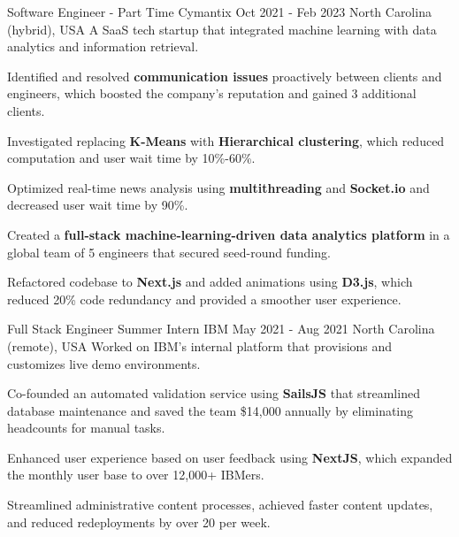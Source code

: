 \begin{cventries}
    \cventry
    {Software Engineer - Part Time} %
    {Cymantix} %
    {Oct 2021 - Feb 2023} %
    {North Carolina (hybrid), USA} %
    {A SaaS tech startup that integrated machine learning with data analytics and information retrieval.}
    {
      \begin{cvitems} %
        \item {Identified and resolved \textbf{communication issues} proactively between clients and engineers, which boosted the company's reputation and gained 3 additional clients.}
        \item {Investigated replacing \textbf{K-Means} with \textbf{Hierarchical clustering}, which reduced computation and user wait time by 10\%-60\%.}
        \item {Optimized real-time news analysis using \textbf{multithreading} and \textbf{Socket.io} and decreased user wait time by 90\%.}
        \item {Created a \textbf{full-stack machine-learning-driven data analytics platform} in a global team of 5 engineers that secured seed-round funding.}
        \item {Refactored codebase to \textbf{Next.js} and added animations using \textbf{D3.js}, which reduced 20\% code redundancy and provided a smoother user experience.}
      \end{cvitems}
    }

    \cventry
    {Full Stack Engineer Summer Intern} %
    {IBM} %
    {May 2021 - Aug 2021} %
    {North Carolina (remote), USA} %
    {Worked on IBM's internal platform that provisions and customizes live demo environments.}
    {
      \begin{cvitems} %
        \item {Co-founded an automated validation service using \textbf{SailsJS} that streamlined database maintenance and saved the team \$14,000 annually by eliminating headcounts for manual tasks.}
        \item {Enhanced user experience based on user feedback using \textbf{NextJS}, which expanded the monthly user base to over 12,000+ IBMers.}
        \item {Streamlined administrative content processes, achieved faster content updates, and reduced redeployments by over 20 per week.}
      \end{cvitems}
    }


\end{cventries}
